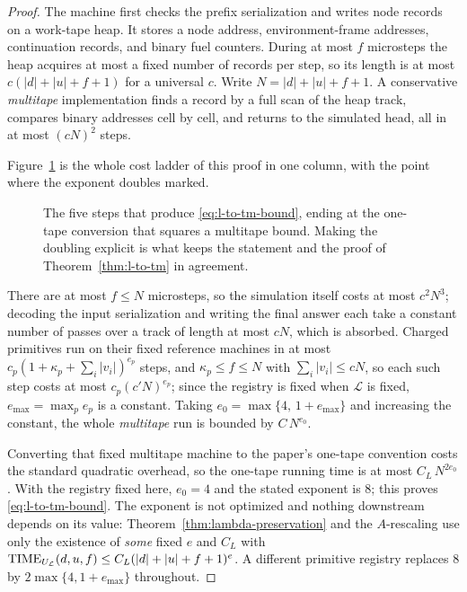 \begin{proof}
The machine first checks the prefix serialization and writes node records on a
work-tape heap.  It stores a node address, environment-frame addresses,
continuation records, and binary fuel counters.  During at most \(f\)
microsteps the heap acquires at most a fixed number of records per step, so its
length is at most \(c(|d|+|u|+f+1)\) for a universal \(c\).  Write
\(N=|d|+|u|+f+1\).  A conservative \emph{multitape} implementation finds a
record by a full scan of the heap track, compares binary addresses cell by
cell, and returns to the simulated head, all in at most \((cN)^2\) steps.

Figure~\ref{fig:exponent-ladder} is the whole cost ladder of this proof in one
column, with the point where the exponent doubles marked.
\begin{figure}[H]
\centering

\caption{The five steps that produce \eqref{eq:l-to-tm-bound}, ending at the one-tape conversion that squares a multitape bound.  Making the doubling explicit is what keeps the statement and the proof of Theorem~\ref{thm:l-to-tm} in agreement.}
\label{fig:exponent-ladder}
\end{figure}

There are at most \(f\leq N\) microsteps, so the simulation itself costs at
most \(c^2N^3\); decoding the input serialization and writing the final answer
each take a constant number of passes over a track of length at most \(cN\),
which is absorbed.  Charged primitives run on their fixed reference machines
in at most \(c_p(1+\kappa_p+\sum_i|v_i|)^{e_p}\) steps, and
\(\kappa_p\leq f\leq N\) with \(\sum_i|v_i|\leq cN\), so each such step costs
at most \(c_p(c'N)^{e_p}\); since the registry is fixed when \(\mathcal L\) is
fixed, \(e_{\max}=\max_pe_p\) is a constant.  Taking
\(e_0=\max\{4,\,1+e_{\max}\}\) and increasing the constant, the whole
\emph{multitape} run is bounded by \(C\,N^{e_0}\).

Converting that fixed multitape machine to the paper's one-tape convention
costs the standard quadratic overhead, so the one-tape running time is at most
\(C_L\,N^{2e_0}\).  With the registry fixed here, \(e_0=4\) and the stated
exponent is \(8\); this proves \eqref{eq:l-to-tm-bound}.  The exponent is not
optimized and nothing downstream depends on its value: Theorem~\ref{thm:lambda-preservation}
and the \(A\)-rescaling use only the existence of \emph{some} fixed \(e\) and
\(C_L\) with \(\operatorname{TIME}_{U_{\mathcal L}}(d,u,f)\leq C_L(|d|+|u|+f+1)^e\).  A
different primitive registry replaces \(8\) by \(2\max\{4,1+e_{\max}\}\)
throughout.


\end{proof}
